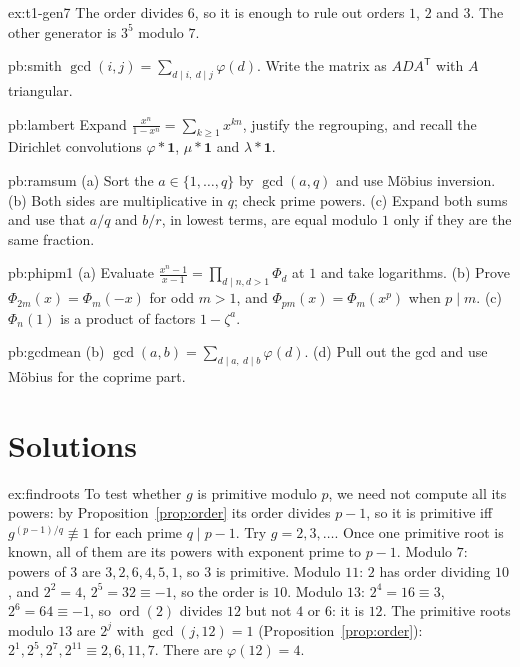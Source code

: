 \begin{hint}{ex:t1-gen7}
The order divides $6$, so it is enough to rule out orders $1$, $2$ and $3$. The other generator is $3^5$ modulo $7$.
\end{hint}

\begin{hint}{pb:smith}
$\gcd(i,j)=\sum_{d\mid i,\ d\mid j}\varphi(d)$. Write the matrix as $ADA^{\mathsf T}$ with $A$ triangular.
\end{hint}

\begin{hint}{pb:lambert}
Expand $\frac{x^n}{1-x^n}=\sum_{k\ge1}x^{kn}$, justify the regrouping, and recall the Dirichlet convolutions $\varphi*\mathbf1$,
$\mu*\mathbf1$ and $\lambda*\mathbf1$.
\end{hint}

\begin{hint}{pb:ramsum}
(a) Sort the $a\in\{1,\dots,q\}$ by $\gcd(a,q)$ and use Möbius inversion. (b) Both sides are multiplicative in $q$; check
prime powers. (c) Expand both sums and use that $a/q$ and $b/r$, in lowest terms, are equal modulo $1$ only if they are
the same fraction.
\end{hint}

\begin{hint}{pb:phipm1}
(a) Evaluate $\frac{x^n-1}{x-1}=\prod_{d\mid n,d>1}\Phi_d$ at $1$ and take logarithms. (b) Prove $\Phi_{2m}(x)=\Phi_m(-x)$
for odd $m>1$, and $\Phi_{pm}(x)=\Phi_m(x^p)$ when $p\mid m$. (c) $\Phi_n(1)$ is a product of factors $1-\zeta^a$.
\end{hint}

\begin{hint}{pb:gcdmean}
(b) $\gcd(a,b)=\sum_{d\mid a,\ d\mid b}\varphi(d)$. (d) Pull out the gcd and use Möbius for the coprime part.
\end{hint}

\section{Solutions}

\begin{solution}{ex:findroots}
\idea To test whether $g$ is primitive modulo $p$, we need not compute all its powers: by Proposition~\ref{prop:order} its order divides $p-1$, so it is primitive iff $g^{(p-1)/q}\not\equiv1$ for each prime $q\mid p-1$. Try $g=2,3,\dots$. Once one primitive root is known, all of them are its powers with exponent prime to $p-1$.
\writeup Modulo $7$: powers of $3$ are $3,2,6,4,5,1$, so $3$ is primitive. Modulo $11$: $2$ has order dividing $10$, and $2^2=4$, $2^5=32\equiv-1$, so the order is $10$. Modulo $13$: $2^4=16\equiv3$, $2^6=64\equiv-1$, so $\operatorname{ord}(2)$ divides $12$ but not $4$ or $6$: it is $12$. The primitive roots modulo $13$ are $2^j$ with $\gcd(j,12)=1$ (Proposition~\ref{prop:order}): $2^1,2^5,2^7,2^{11}\equiv2,6,11,7$. There are $\varphi(12)=4$.
\end{solution}

